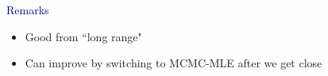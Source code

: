 \documentclass[ 10pt]{beamer}
\begin{document}
{{\begin{table}
\begin{center}
\begin{tabular}{rrrrrrr}
   \hline
\end{tabular}
\end{center}
\end{table}
}

\textcolor{darkblue}{Remarks}
\begin{itemize}
\item Good from ``long range"

\item Can improve by switching to MCMC-MLE after we get close
\end{itemize}
}
\end{document}
